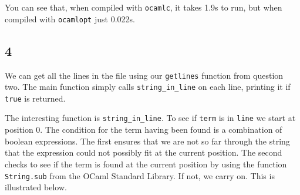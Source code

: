 \documentclass[]{book}
\begin{document}
\noindent You can see that, when compiled with \texttt{ocamlc}, it takes 1.9s to run, but when compiled with \texttt{ocamlopt} just 0.022s.

\subsection*{4}
We can get all the lines in the file using our \texttt{getlines} function from question two. The main function simply calls \texttt{string\_in\_line} on each line, printing it if \texttt{true} is returned.

The interesting function is \texttt{string\_in\_line}. To see if \texttt{term} is in \texttt{line} we start at position 0. The condition for the term having been found is a combination of boolean expressions. The first ensures that we are not so far through the string that the expression could not possibly fit at the current position. The second checks to see if the term is found at the current position by using the function \texttt{String.sub} from the OCaml Standard Library. If not, we carry on. This is illustrated below.
\end{document}
